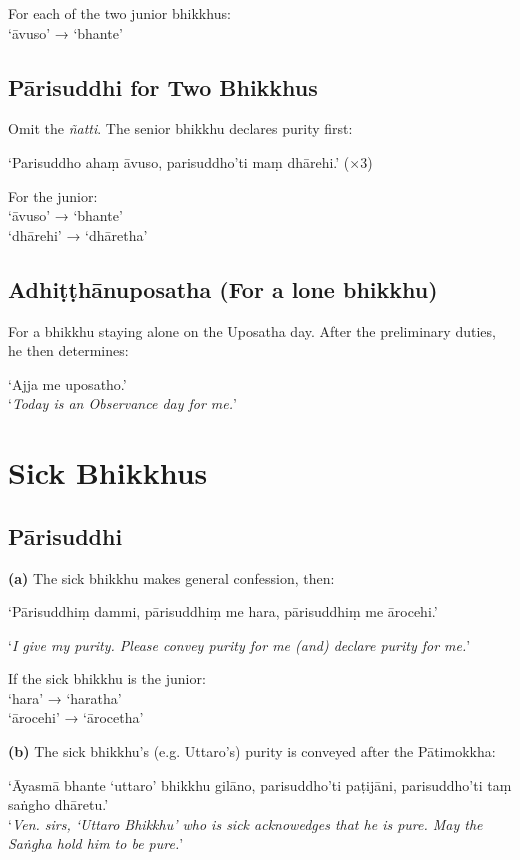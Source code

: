 For each of the two junior bhikkhus:\\
‘āvuso’ → ‘bhante’

\subsection{Pārisuddhi for Two Bhikkhus}

Omit the \emph{ñatti}. The senior bhikkhu declares purity first:

‘Parisuddho ahaṃ āvuso, parisuddho'ti maṃ dhārehi.’ (×3)

For the junior:\\
‘āvuso’ → ‘bhante’\\
‘dhārehi’ → ‘dhāretha’

\subsection{Adhiṭṭhānuposatha (For a lone bhikkhu)}

For a bhikkhu staying alone on the Uposatha day. After the preliminary duties,
he then determines:

‘Ajja me uposatho.’\\
‘\emph{Today is an Observance day for me.}’

\section{Sick Bhikkhus}

\subsection{Pārisuddhi}

\textbf{(a)} The sick bhikkhu makes general confession, then:

‘Pārisuddhiṃ dammi, pārisuddhiṃ me hara, pārisuddhiṃ me ārocehi.’

‘\emph{I give my purity. Please convey purity for me (and) declare purity for me.}’

If the sick bhikkhu is the junior:\\
‘hara’ → ‘haratha’\\
‘ārocehi’ → ‘ārocetha’

\ifhandbookedition
\clearpage
\fi

\textbf{(b)} The sick bhikkhu's (e.g. Uttaro's) purity is conveyed after the
Pātimokkha:

‘Āyasmā bhante ‘uttaro’ bhikkhu gilāno, parisuddho'ti paṭijāni, parisuddho'ti taṃ saṅgho dhāretu.’\\
‘\emph{Ven. sirs, ‘Uttaro Bhikkhu’ who is sick acknowedges that he is pure. May
  the Saṅgha hold him to be pure.}’


